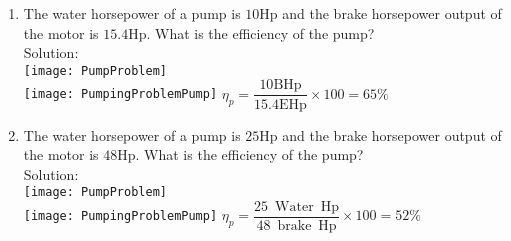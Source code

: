\begin{enumerate}[1.]
\item The water horsepower of a pump is $10 \mathrm{Hp}$ and the brake horsepower output of the motor is $15.4 \mathrm{Hp}$. What is the efficiency of the pump?\\
\vspace{0.2cm}
Solution:\\ 
 \vspace{0.2cm}
 \vspace{0.4cm}\texttt{[image: PumpProblem]}\\
 \vspace{0.2cm}
 \texttt{[image: PumpingProblemPump]}
 $\eta_p=\dfrac{10 \mathrm{BHp}}{15.4 \mathrm{EHp}} \times 100=\boxed{65 \%}$\\
 \vspace{0.2cm}
 \item The water horsepower of a pump is $25 \mathrm{Hp}$ and the brake horsepower output of the motor is $48 \mathrm{Hp}$. What is the efficiency of the pump?\\
 Solution:\\
  \vspace{0.2cm}
 \vspace{0.32cm}\texttt{[image: PumpProblem]}\\
 \vspace{0.2cm}
 \texttt{[image: PumpingProblemPump]}
 \vspace{0.2cm}
$\eta_p=\dfrac{25 \mathrm{\enspace Water \enspace Hp}}{48 \mathrm{\enspace brake \enspace Hp}} \times 100=\boxed{52 \%}$
  \vspace{0.4cm}
\end{enumerate}
\newpage
